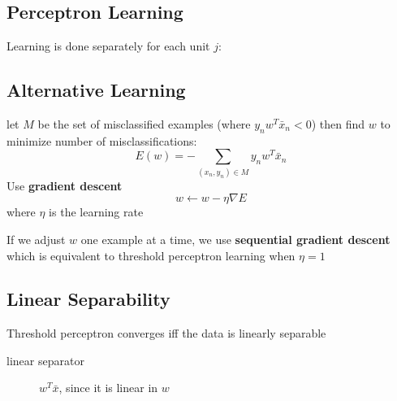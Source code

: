 \documentclass[]{article}
\theoremstyle{definition}
\begin{document}
    \subsection{Perceptron Learning}
    \label{sub:perceptron_learning}

    Learning is done separately for each unit $j$:
    \begin{algorithmic}
        \EndIf
        \EndFor
    \end{algorithmic}

    \subsection{Alternative Learning}
    \label{sub:alternative_learning}
    let $M$ be the set of misclassified examples (where $y_n w^T \bar x_n < 0$) then find $w$ to minimize number of misclassifications:
    \begin{equation*}
        E(w) = - \sum_{(x_n, y_n) \in M} y_n w^T \bar x_n
    \end{equation*}
    Use \textbf{gradient descent} 
    \begin{equation*}
        w \leftarrow w - \eta \nabla E 
    \end{equation*}
    where $\eta$ is the learning rate

    \vspace{5mm}

    If we adjust $w$ one example at a time, we use \textbf{sequential gradient descent} which is equivalent to threshold perceptron learning when $\eta = 1$

    \subsection{Linear Separability}
    \label{sub:linear_separability}
    Threshold perceptron converges iff the data is linearly separable

    \begin{description}
        \item[linear separator] $w^T \bar x$, since it is linear in $w$
    \end{description} 
\end{document}

